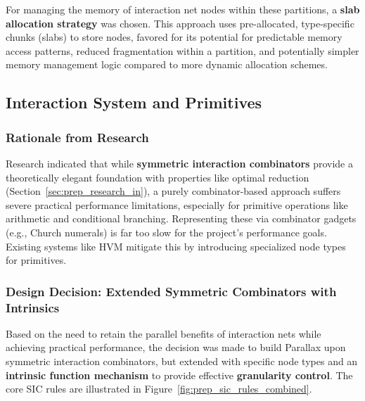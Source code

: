 For managing the memory of interaction net nodes within these partitions, a \textbf{slab allocation strategy} was chosen. This approach uses pre-allocated, type-specific chunks (slabs) to store nodes, favored for its potential for predictable memory access patterns, reduced fragmentation within a partition, and potentially simpler memory management logic compared to more dynamic allocation schemes.

\subsection{Interaction System and Primitives}\label{sec:prep_decision_in}

\subsubsection*{Rationale from Research}
Research indicated that while \textbf{symmetric interaction combinators} provide a theoretically elegant foundation with properties like optimal reduction (Section~\ref{sec:prep_research_in}), a purely combinator-based approach suffers severe practical performance limitations, especially for primitive operations like arithmetic and conditional branching. Representing these via combinator gadgets (e.g., Church numerals) is far too slow for the project's performance goals. Existing systems like HVM mitigate this by introducing specialized node types for primitives.

\subsubsection*{Design Decision: Extended Symmetric Combinators with Intrinsics}
Based on the need to retain the parallel benefits of interaction nets while achieving practical performance, the decision was made to build Parallax upon symmetric interaction combinators, but extended with specific node types and an \textbf{intrinsic function mechanism} to provide effective \textbf{granularity control}. The core SIC rules are illustrated in Figure~\ref{fig:prep_sic_rules_combined}.


